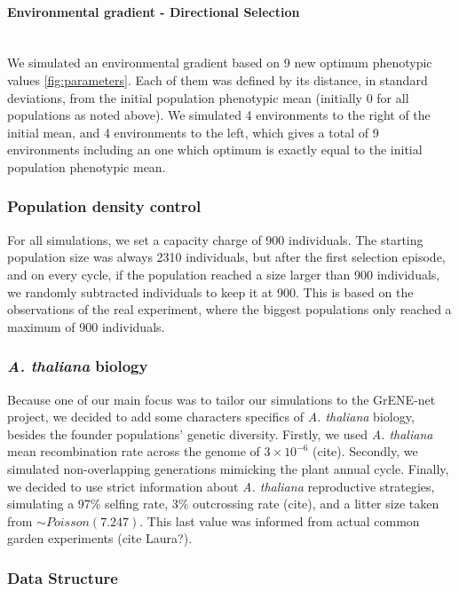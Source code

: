\documentclass{article}
\let\oldparagraph\paragraph
\renewcommand{\paragraph}[1]{\oldparagraph{#1}\mbox{}\\}
\begin{document}
\paragraph{Environmental gradient - Directional Selection}
We simulated an environmental gradient based on 9 new optimum phenotypic values \ref{fig:parameters}. Each of them was defined by its distance, in standard deviations, from the initial population phenotypic mean (initially 0 for all populations as noted above). We simulated 4 environments to the right of the initial mean, and 4 environments to the left, which gives a total of 9 environments including an one which optimum is exactly equal to the initial population phenotypic mean. 

\subsubsection{Population density control}
For all simulations, we set a capacity charge of 900 individuals. The starting population size was always 2310 individuals, but after the first selection episode, and on every cycle, if the population reached a size larger than 900 individuals, we randomly subtracted individuals to keep it at 900. This is based on the observations of the real experiment, where the biggest populations only reached a maximum of 900 individuals. 

\subsubsection{\textit{A. thaliana} biology}
Because one of our main focus was to tailor our simulations to the GrENE-net project, we decided to add some characters specifics of \textit{A. thaliana} biology, besides the founder populations' genetic diversity. Firstly, we used \textit{A. thaliana} mean recombination rate across the genome of $3 \times 10^{-6}$ (cite). Secondly, we simulated non-overlapping generations mimicking the plant annual cycle. Finally, we decided to use strict information about \textit{A. thaliana} reproductive strategies, simulating a 97\% selfing rate, 3\% outcrossing rate (cite), and a litter size taken from $\sim Poisson(7.247)$. This last value was informed from actual common garden experiments (cite Laura?). 

\subsubsection{Data Structure}
\end{document}
